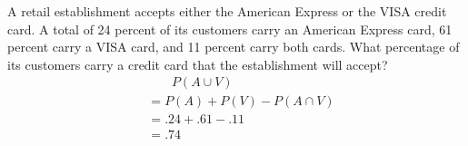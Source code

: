 \item A retail establishment accepts either the American Express or the VISA credit card. A total of 24 percent of its customers carry an American Express card, 61 percent carry a VISA card, and 11 percent carry both cards. What percentage of its customers carry a credit card that the establishment will accept?
\begin{align*}
    &\phantom{\;=\;} P(A\cup V)\\
    &= P(A) + P(V) - P(A \cap V)\\
    &= .24 + .61 - .11\\
    &= .74
\end{align*}
